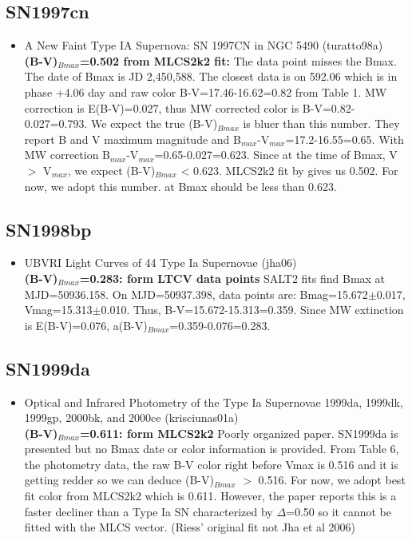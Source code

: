\subsection{\bf SN1997cn}
\begin{itemize}
\item A New Faint Type IA Supernova: SN 1997CN in NGC 5490 (turatto98a) \citet{turatto98a}\\
{\bf (B-V)$_{Bmax}$=0.502 from MLCS2k2 fit:}
The data point misses the Bmax.  The date of Bmax is JD 2,450,588.  The closest data
is on 592.06 which is in phase +4.06 day and raw color B-V=17.46-16.62=0.82 from Table 1.
MW correction is E(B-V)=0.027, thus MW corrected color is B-V=0.82-0.027=0.793.
We expect the true (B-V)$_{Bmax}$ is bluer than this number.   They report B and V maximum
magnitude and B$_{max}$-V$_{max}$=17.2-16.55=0.65.  
With MW correction B$_{max}$-V$_{max}$=0.65-0.027=0.623.  Since at the time of Bmax,
V $>$ V$_{max}$, we expect (B-V)$_{Bmax}$ < 0.623.   MLCS2k2 fit by \citet{jha07a} gives
us 0.502.  For now, we adopt this number.
at Bmax should be less than 0.623.
\end{itemize}

\subsection{SN1998bp}
\begin{itemize}
\item UBVRI Light Curves of 44 Type Ia Supernovae (jha06) \citet{jha06}\\
{\bf (B-V)$_{Bmax}$=0.283: form LTCV data points} SALT2 fits find Bmax at MJD=50936.158.
On MJD=50937.398, data points are: Bmag=15.672$\pm$0.017, Vmag=15.313$\pm$0.010.
Thus, B-V=15.672-15.313=0.359.  Since MW extinction is E(B-V)=0.076, 
a(B-V)$_{Bmax}$=0.359-0.076=0.283.

\end{itemize}

\subsection{SN1999da}
\begin{itemize}
\item Optical and Infrared Photometry of the Type Ia Supernovae 1999da, 1999dk, 1999gp, 2000bk, and 2000ce
(krisciunas01a) \citet{krisciunas01a}\\
{\bf (B-V)$_{Bmax}$=0.611: form MLCS2k2}
Poorly organized paper.  SN1999da is presented but no Bmax date or color information is
provided.  From Table 6, the photometry data, the raw B-V color right before Vmax is
0.516 and it is getting redder so we can deduce (B-V)$_{Bmax}$ $>$ 0.516.  For now, we adopt
best fit color from MLCS2k2 which is 0.611.
However, the paper reports this is a faster decliner than a Type Ia SN characterized by $\Delta$=0.50
so it cannot be fitted with the MLCS vector. (Riess' original fit not Jha et al 2006)
\end{itemize}

